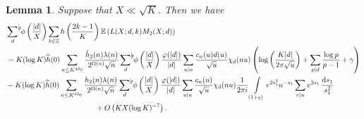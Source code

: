 \documentclass[a4paper,10pt,twoside]{amsart}
\newtheorem{lemma}[theorem]{Lemma}
\theoremstyle{definition}
\numberwithin{equation}{section}
\newcommand\Z{\mathbb{Z}}
\newcommand\eps{\varepsilon}
\renewcommand\:{\colon}
\newcommand{\sumflat}{\mathop{{\sum}^{\raisebox{-3pt}{\makebox[0pt][l]{$\flat$}}}}}
\begin{document}
\begin{lemma}\label{random-averaged}
Suppose that $X\ll\sqrt K$. Then we have
\begin{align*}
&\sumflat_{d}\,\phi\left(\frac{|d|}X\right)\sum_{k\in\Z}h\left(\frac{2k-1}K\right)\mathbb E\left(L(X;d,k)M_2(X;d)\right)\\
&=K(\log K)\widehat h(0)\sum_{n\leq K^{4\delta_0}}\frac{\breve h_2(n)\lambda(n)}{2^{\Omega(n)}\sqrt n}\sumflat_{d}\,\phi\left(\frac{|d|}X\right)\frac{\varphi(|d|)}{|d|}\sum_{u|n}\frac{c_n(u)d(u)}{\sqrt u}\chi_d(nu)\left(\log\left(\frac{K|d|}{2\pi\sqrt u}\right)+\sum_{p|d}\frac{\log p}{p-1}+\gamma\right)\\
&-K(\log K)\widehat h(0)\sum_{n\leq K^{4\delta_0}}\frac{h_2(n)\lambda(n)}{2^{\Omega(n)}\sqrt n}\sumflat_{d}\,\phi\left(\frac{|d|}X\right)\frac{\varphi(|d|)}{|d|}\sum_{u|n}\frac{c_n(u)}{\sqrt u}\chi_d(nu)\frac1{2\pi i}\int\limits_{(1+\eps)}e^{2s_1^2}u^{-s_1}\sum_{v|u}v^{2s_1}\,\frac{\mathrm d s_1}{s_1^2}\\&\qquad\qquad\qquad\qquad\qquad\qquad+O\left(KX(\log K)^{-7}\right).
\end{align*}  
\end{lemma}
\end{document}
